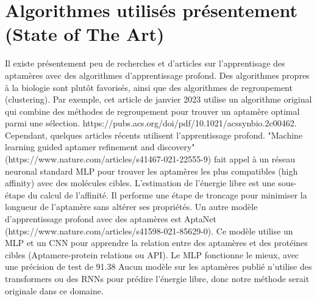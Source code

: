 \documentclass{article}
\begin{document}
\section*{Algorithmes utilisés présentement (State of The Art)}
Il existe présentement peu de recherches et d'articles sur l'apprentisage des aptamères avec des algorithmes d'apprentissage profond. Des algorithmes propres à la biologie sont plutôt favorisés, ainsi que des algorithmes de regroupement (clustering). Par exemple, cet article de janvier 2023 utilise un algorithme original qui combine des méthodes de regroupement pour trouver un aptamère optimal parmi une sélection. https://pubs.acs.org/doi/pdf/10.1021/acssynbio.2c00462.
Cependant, quelques articles récents utilisent l'apprentissage profond. "Machine learning guided aptamer refinement and discovery" (https://www.nature.com/articles/s41467-021-22555-9) fait appel à un réseau neuronal standard MLP pour trouver les aptamères les plus compatibles (high affinity) avec des molécules cibles. L'estimation de l'énergie libre est une sous-étape du calcul de l'affinité. Il performe une étape de troncage pour minimiser la longueur de l'aptamère sans altérer ses propriétés. 
Un autre modèle d'apprentissage profond avec des aptamères est AptaNet (https://www.nature.com/articles/s41598-021-85629-0). Ce modèle utilise un MLP et un CNN pour apprendre la relation entre des aptamères et des protéines cibles (Aptamere-protein relations ou API). Le MLP fonctionne le mieux, avec une précision de test de 91.38%
Aucun modèle sur les aptamères publié n'utilise des transformers ou des RNNs pour prédire l'énergie libre, donc notre méthode serait originale dans ce domaine.





\end{document}

